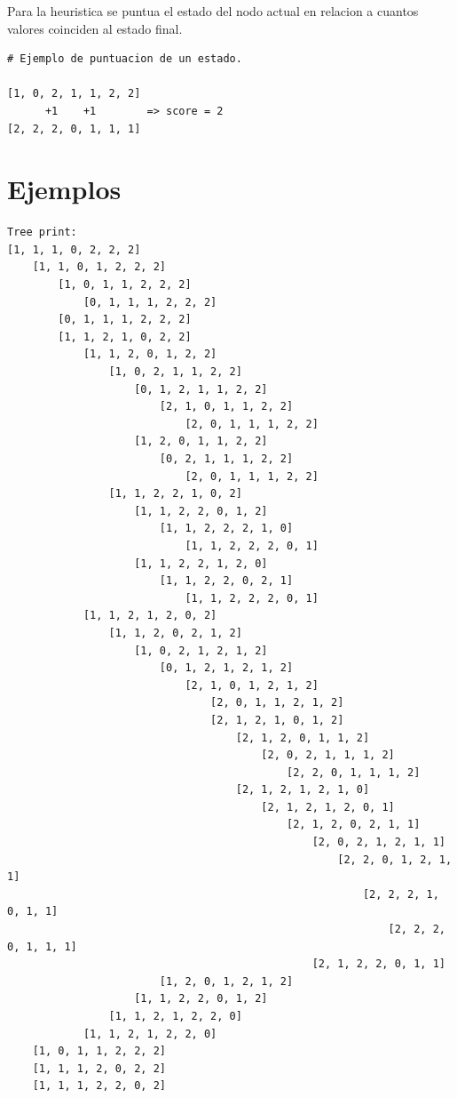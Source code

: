 \documentclass[letterpaper]{article}
\begin{document}
Para la heuristica se puntua el estado del nodo actual en relacion a cuantos valores coinciden al estado final.

\begin{lstlisting}
# Ejemplo de puntuacion de un estado.

[1, 0, 2, 1, 1, 2, 2]
      +1    +1        => score = 2
[2, 2, 2, 0, 1, 1, 1]

\end{lstlisting}

\newpage
\section{Ejemplos}

\begin{lstlisting}
Tree print:
[1, 1, 1, 0, 2, 2, 2]
    [1, 1, 0, 1, 2, 2, 2]
        [1, 0, 1, 1, 2, 2, 2]
            [0, 1, 1, 1, 2, 2, 2]
        [0, 1, 1, 1, 2, 2, 2]
        [1, 1, 2, 1, 0, 2, 2]
            [1, 1, 2, 0, 1, 2, 2]
                [1, 0, 2, 1, 1, 2, 2]
                    [0, 1, 2, 1, 1, 2, 2]
                        [2, 1, 0, 1, 1, 2, 2]
                            [2, 0, 1, 1, 1, 2, 2]
                    [1, 2, 0, 1, 1, 2, 2]
                        [0, 2, 1, 1, 1, 2, 2]
                            [2, 0, 1, 1, 1, 2, 2]
                [1, 1, 2, 2, 1, 0, 2]
                    [1, 1, 2, 2, 0, 1, 2]
                        [1, 1, 2, 2, 2, 1, 0]
                            [1, 1, 2, 2, 2, 0, 1]
                    [1, 1, 2, 2, 1, 2, 0]
                        [1, 1, 2, 2, 0, 2, 1]
                            [1, 1, 2, 2, 2, 0, 1]
            [1, 1, 2, 1, 2, 0, 2]
                [1, 1, 2, 0, 2, 1, 2]
                    [1, 0, 2, 1, 2, 1, 2]
                        [0, 1, 2, 1, 2, 1, 2]
                            [2, 1, 0, 1, 2, 1, 2]
                                [2, 0, 1, 1, 2, 1, 2]
                                [2, 1, 2, 1, 0, 1, 2]
                                    [2, 1, 2, 0, 1, 1, 2]
                                        [2, 0, 2, 1, 1, 1, 2]
                                            [2, 2, 0, 1, 1, 1, 2]
                                    [2, 1, 2, 1, 2, 1, 0]
                                        [2, 1, 2, 1, 2, 0, 1]
                                            [2, 1, 2, 0, 2, 1, 1]
                                                [2, 0, 2, 1, 2, 1, 1]
                                                    [2, 2, 0, 1, 2, 1, 1]
                                                        [2, 2, 2, 1, 0, 1, 1]
                                                            [2, 2, 2, 0, 1, 1, 1]
                                                [2, 1, 2, 2, 0, 1, 1]
                        [1, 2, 0, 1, 2, 1, 2]
                    [1, 1, 2, 2, 0, 1, 2]
                [1, 1, 2, 1, 2, 2, 0]
            [1, 1, 2, 1, 2, 2, 0]
    [1, 0, 1, 1, 2, 2, 2]
    [1, 1, 1, 2, 0, 2, 2]
    [1, 1, 1, 2, 2, 0, 2]
\end{lstlisting}
\newpage
\end{document}
